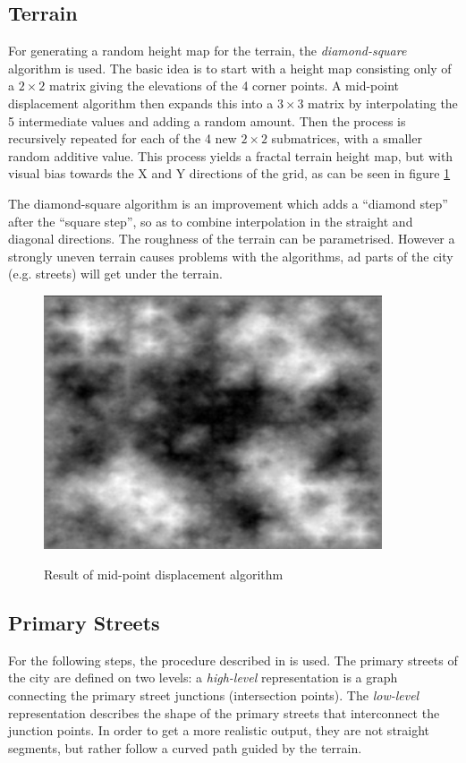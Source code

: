 \documentclass[a4paper,12pt]{scrartcl}
\begin{document}
\subsection{Terrain}
For generating a random height map for the terrain, the \emph{diamond-square} algorithm is used. The basic idea is to start with a height map consisting only of a $2 \times 2$ matrix giving the elevations of the 4 corner points. A mid-point displacement algorithm then expands this into a $3 \times 3$ matrix by interpolating the 5 intermediate values and adding a random amount. Then the process is recursively repeated for each of the 4 new $2 \times 2$ submatrices, with a smaller random additive value. This process yields a fractal terrain height map, but with visual bias towards the X and Y directions of the grid, as can be seen in figure \ref{fig:plasma}

The diamond-square algorithm is an improvement which adds a ``diamond step'' after the ``square step'', so as to combine interpolation in the straight and diagonal directions. The roughness of the terrain can be parametrised. However a strongly uneven terrain causes problems with the algorithms, ad parts of the city (e.g. streets) will get under the terrain.

\begin{figure}[h]
\center
\includegraphics[width=10cm]{Plasmafractal.jpg}
\label{fig:plasma}
\caption{Result of mid-point displacement algorithm}
\end{figure}


\subsection{Primary Streets}
For the following steps, the procedure described in \cite{Kell2007} is used. The primary streets of the city are defined on two levels: a \emph{high-level} representation is a graph connecting the primary street junctions (intersection points). The \emph{low-level} representation describes the shape of the primary streets that interconnect the junction points. In order to get a more realistic output, they are not straight segments, but rather follow a curved path guided by the terrain.
\end{document}

